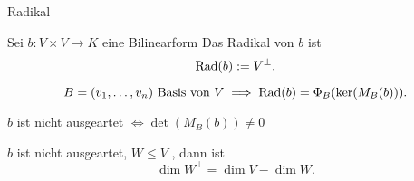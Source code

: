 \documentclass[class=article, crop=false]{standalone}
\begin{document}
\begin{zettel}{Radikal}

\begin{flashcard}[dbyxvat6]{}
	\begin{definition}[Radikal]
		Sei $b: V \times V \to  K$ eine Bilinearform Das Radikal von $b$ ist
		\[
			\operatorname{Rad}(b) := V^\perp
		.\]
	\end{definition}
\end{flashcard}

\begin{theorem}
	\[
		B = ( v_1,\dots,v_n) \text{ Basis von } V \implies \operatorname{Rad}(b)= \Phi_{B} ( \ker(M_B (b)))
	.\]
\end{theorem}
\begin{corollary}
	$b$ ist nicht ausgeartet $\iff \det (M_B(b) ) \neq 0$
\end{corollary}
\begin{theorem}
	$b$ ist nicht ausgeartet, $W \leq V$ , dann ist
	\[
		\dim W^{\perp}= \dim V - \dim W
	.\]
\end{theorem}
\end{zettel}
\end{document}

